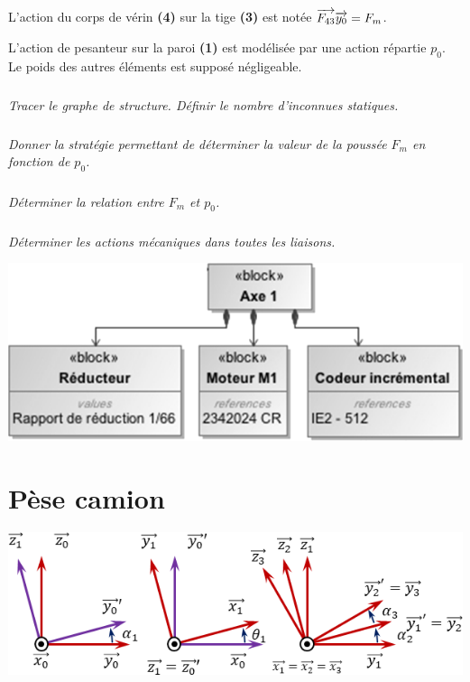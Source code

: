 \documentclass[10pt,fleqn]{article} %
\begin{document}
\begin{multicols}{2}
L'action du corps de vérin \textbf{(4)} sur la tige \textbf{(3)} est notée $\overrightarrow{F_{43}}\overrightarrow{y_0}=F_m$.

L'action de pesanteur sur la paroi \textbf{(1)} est modélisée par une action répartie $p_0$. Le poids des autres éléments est supposé négligeable.


\subparagraph{}\textit{Tracer le graphe de structure. Définir le nombre d'inconnues statiques.}

\subparagraph{}\textit{Donner la stratégie permettant de déterminer la valeur de la poussée $F_m$ en fonction de $p_0$.}

\subparagraph{}\textit{Déterminer la relation entre $F_m$ et $p_0$.}

\subparagraph{}\textit{Déterminer les actions mécaniques dans toutes les liaisons.}



\begin{center}
\includegraphics[width=.9\linewidth]{images/fig_04}
\end{center}

\section*{Pèse camion}

\begin{center}
\includegraphics[width=.9\linewidth]{images/fig_05}
\end{center}


\end{multicols}
\end{document}
